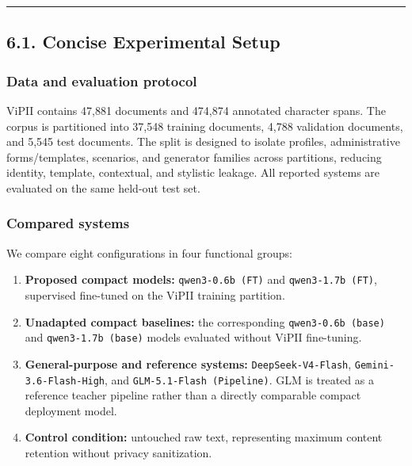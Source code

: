 \documentclass[
]{article}
\providecommand{\tightlist}{%
  \setlength{\itemsep}{0pt}\setlength{\parskip}{0pt}}
\begin{document}
\begin{center}\rule{0.5\linewidth}{0.5pt}\end{center}

\subsection{6.1. Concise Experimental
Setup}\label{concise-experimental-setup}

\subsubsection{Data and evaluation
protocol}\label{data-and-evaluation-protocol}

ViPII contains 47,881 documents and 474,874 annotated character spans.
The corpus is partitioned into 37,548 training documents, 4,788
validation documents, and 5,545 test documents. The split is designed to
isolate profiles, administrative forms/templates, scenarios, and
generator families across partitions, reducing identity, template,
contextual, and stylistic leakage. All reported systems are evaluated on
the same held-out test set.

\subsubsection{Compared systems}\label{compared-systems}

We compare eight configurations in four functional groups:

\begin{enumerate}
\def\labelenumi{\arabic{enumi}.}
\tightlist
\item
  \textbf{Proposed compact models:} \texttt{qwen3-0.6b\ (FT)} and
  \texttt{qwen3-1.7b\ (FT)}, supervised fine-tuned on the ViPII training
  partition.
\item
  \textbf{Unadapted compact baselines:} the corresponding
  \texttt{qwen3-0.6b\ (base)} and \texttt{qwen3-1.7b\ (base)} models
  evaluated without ViPII fine-tuning.
\item
  \textbf{General-purpose and reference systems:}
  \texttt{DeepSeek-V4-Flash}, \texttt{Gemini-3.6-Flash-High}, and
  \texttt{GLM-5.1-Flash\ (Pipeline)}. GLM is treated as a reference
  teacher pipeline rather than a directly comparable compact deployment
  model.
\item
  \textbf{Control condition:} untouched raw text, representing maximum
  content retention without privacy sanitization.
\end{enumerate}
\end{document}
